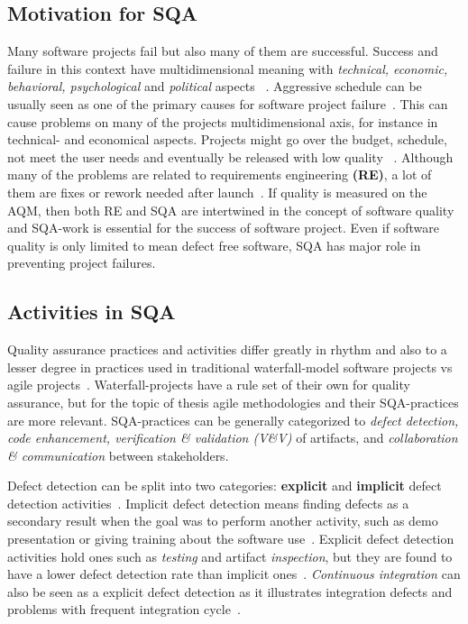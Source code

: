     \subsection{Motivation for SQA}
    Many software projects fail but also many of them are successful. Success and failure in this context have multidimensional meaning with
    \textit{technical, economic, behavioral, psychological} and \textit{political} aspects ~\cite{mcleod2011factors}. Aggressive
    schedule can be usually seen as one of the primary causes for software project failure~\cite{cerpa2009did}. This can cause
    problems on many of the projects multidimensional axis, for instance in technical- and economical aspects. Projects might go
    over the budget, schedule, not meet the user needs and eventually be released with low quality ~\cite{cerpa2009did}.
    Although many of the problems are related to requirements engineering \textbf{(RE)}, a lot of them are fixes or rework needed after launch~\cite{lessons}.
    If quality is measured on the AQM, then both RE and SQA are intertwined in the concept of software quality and SQA-work
    is essential for the success of software project. Even if software quality is only limited to mean defect free software, SQA has
    major role in preventing project failures.

    \subsection{Activities in SQA}
    Quality assurance practices and activities differ greatly in rhythm and also to a lesser degree in practices used in
    traditional waterfall-model software projects vs agile projects~\cite{huo2004software}. Waterfall-projects have a rule set
    of their own for quality assurance, but for the topic of thesis agile methodologies and their SQA-practices are more relevant.
    SQA-practices can be generally categorized to \textit{defect detection, code enhancement, verification \& validation (V\&V)} of artifacts,
    and \textit{collaboration \& communication} between stakeholders.

    Defect detection can be split into two categories: \textbf{explicit} and \textbf{implicit} defect detection activities~\cite{mantyla2014software}.
    Implicit defect detection means finding defects as a secondary result when the goal was to perform another activity,
    such as demo presentation or giving training about the software use~\cite{mantyla2014software}. Explicit defect detection activities
    hold ones such as \textit{testing} and artifact \textit{inspection}, but they are found to have a lower
    defect detection rate than implicit ones~\cite{mantyla2014software}. \textit{Continuous integration} can also be seen
    as a explicit defect detection as it illustrates integration defects and problems with frequent integration cycle~\cite{huo2004software}.

